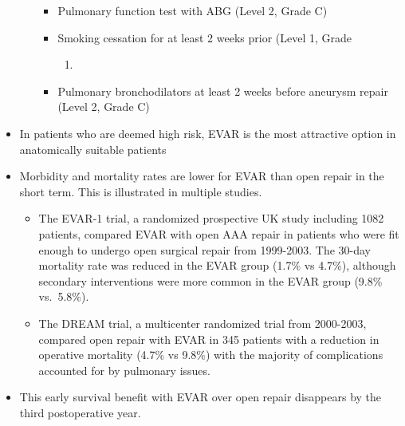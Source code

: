 \documentclass[
]{book}
\providecommand{\tightlist}{%
  \setlength{\itemsep}{0pt}\setlength{\parskip}{0pt}}
\begin{document}
\begin{itemize}
\begin{itemize}
    \begin{itemize}
    \item
      Pulmonary function test with ABG (Level 2, Grade C)
    \item
      Smoking cessation for at least 2 weeks prior (Level 1, Grade

      \begin{enumerate}
      \def\labelenumi{\Alph{enumi})}
      \setcounter{enumi}{2}
      \tightlist
      \item
      \end{enumerate}
    \item
      Pulmonary bronchodilators at least 2 weeks before aneurysm
      repair (Level 2, Grade C)
    \end{itemize}
  \end{itemize}
\item
  In patients who are deemed high risk, EVAR is the most attractive
  option in anatomically suitable patients
\item
  Morbidity and mortality rates are lower for EVAR than open repair in
  the short term. This is illustrated in multiple studies.

  \begin{itemize}
  \item
    The EVAR-1 trial, a randomized prospective UK study including
    1082 patients, compared EVAR with open AAA repair in patients
    who were fit enough to undergo open surgical repair from
    1999-2003. The 30-day mortality rate was reduced in the EVAR
    group (1.7\% vs 4.7\%), although secondary interventions were more
    common in the EVAR group (9.8\% vs.~5.8\%).
    \citep{greenhalghComparisonEndovascularAneurysm2004}
  \item
    The DREAM trial, a multicenter randomized trial from 2000-2003,
    compared open repair with EVAR in 345 patients with a reduction
    in operative mortality (4.7\% vs 9.8\%) with the majority of
    complications accounted for by pulmonary issues.
    \citep{prinssenRandomizedTrialComparing2004}
  \end{itemize}
\item
  This early survival benefit with EVAR over open repair disappears by
  the third postoperative year.


\end{itemize}
\end{document}
